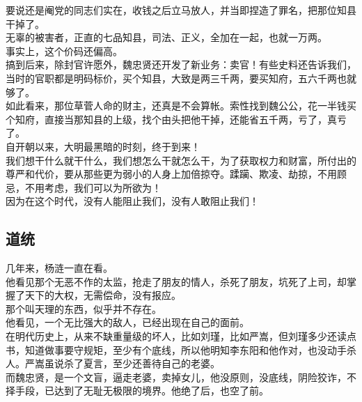 \begin{multicols}{\theparacolNo}
要说还是阉党的同志们实在，收钱之后立马放人，并当即捏造了罪名，把那位知县干掉了。\\

无辜的被害者，正直的七品知县，司法、正义，全加在一起，也就一万两。\\

事实上，这个价码还偏高。\\

搞到后来，除封官许愿外，魏忠贤还开发了新业务：卖官！有些史料还告诉我们，当时的官职都是明码标价，买个知县，大致是两三千两，要买知府，五六千两也就够了。\\

如此看来，那位草菅人命的财主，还真是不会算帐。索性找到魏公公，花一半钱买个知府，直接当那知县的上级，找个由头把他干掉，还能省五千两，亏了，真亏了。\\

自开朝以来，大明最黑暗的时刻，终于到来！\\

我们想干什么就干什么，我们想怎么干就怎么干，为了获取权力和财富，所付出的尊严和代价，要从那些更为弱小的人身上加倍掠夺。蹂躏、欺凌、劫掠，不用顾忌，不用考虑，我们可以为所欲为！\\

因为在这个时代，没有人能阻止我们，没有人敢阻止我们！\\

\subsection{道统}
几年来，杨涟一直在看。\\

他看见那个无恶不作的太监，抢走了朋友的情人，杀死了朋友，坑死了上司，却掌握了天下的大权，无需偿命，没有报应。\\

那个叫天理的东西，似乎并不存在。\\

他看见，一个无比强大的敌人，已经出现在自己的面前。\\

在明代历史上，从来不缺重量级的坏人，比如刘瑾，比如严嵩，但刘瑾多少还读点书，知道做事要守规矩，至少有个底线，所以他明知李东阳和他作对，也没动手杀人。严嵩虽说杀了夏言，至少还善待自己的老婆。\\

而魏忠贤，是一个文盲，逼走老婆，卖掉女儿，他没原则，没底线，阴险狡诈，不择手段，已达到了无耻无极限的境界。他绝了后，也空了前。\\


\end{multicols}
